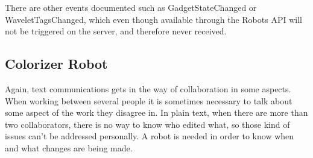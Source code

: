 There are other events documented such as GadgetStateChanged or WaveletTagsChanged, which even though available through the Robots API will not be triggered on the server, and therefore never received.

\subsection{Colorizer Robot}
Again, text communications gets in the way of collaboration in some aspects. When working between several people it is sometimes necessary to talk about some aspect of the work they disagree in. In plain text, when there are more than two collaborators, there is no way to know who edited what, so those kind of issues can't be addressed personally. A robot is needed in order to know when and what changes are being made.

